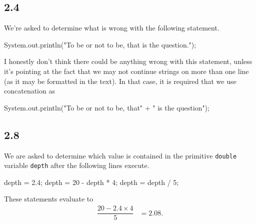 \documentclass[leqno, 11pt]{article}
\begin{document}
\subsection*{2.4}
We're asked to determine what is wrong with the following statement.
\begin{verbbox}
System.out.println("To be or not to be, that is the question.");
\end{verbbox}
\begin{center}
\theverbbox
\end{center}
I honestly don't think there could be anything wrong with this statement, unless it's pointing at the fact that we may not continue strings on more than one line (as it may be formatted in the text). In that case, it is required that we use concatenation as
\begin{verbbox}
System.out.println("To be or not to be, that"
    + " is the question");
\end{verbbox}
\begin{center}
\theverbbox
\end{center}
\subsection*{2.8}
We are asked to determine which value is contained in the primitive \texttt{double} variable \texttt{depth} after the following lines execute.
\begin{verbbox}
depth = 2.4;
depth = 20 - depth * 4;
depth = depth / 5;
\end{verbbox}
\begin{center}
\theverbbox
\end{center}
These statements evaluate to
\begin{align*}
\dfrac{20 - 2.4\times 4}{5}&=\boxed{2.08.}
\end{align*}
\end{document}
